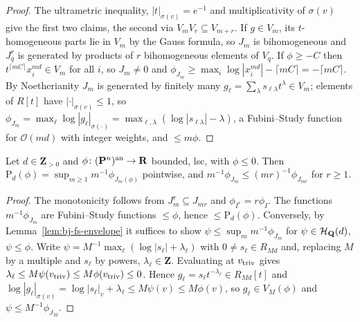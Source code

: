 \begin{proof}
The ultrametric inequality, $|t|_{\sigma(v)}=e^{-1}$ and multiplicativity of $\sigma(v)$ give the first
two claims, the second via $V_mV_r\subseteq V_{m+r}$. If $g\in V_m$, its $t$-homogeneous parts lie in $V_m$
by the Gauss formula, so $J_m$ is bihomogeneous and $J_q^r$ is generated by products of $r$ bihomogeneous
elements of $V_q$. If $\phi\ge-C$ then $t^{\lceil mC\rceil}x_i^{md}\in V_m$ for all $i$, so $J_m\ne0$ and
$\phi_{J_m}\ge\max_i\log|x_i^{md}|-\lceil mC\rceil=-\lceil mC\rceil$. By Noetherianity $J_m$ is
generated by finitely many $g_\ell=\sum_\lambda s_{\ell\lambda}t^\lambda\in V_m$; elements of $R[t]$ have
$|\cdot|_{\sigma(v)}\le1$, so $\phi_{J_m}=\max_\ell\log|g_\ell|_{\sigma(\cdot)}
=\max_{\ell,\lambda}(\log|s_{\ell\lambda}|-\lambda)$, a Fubini--Study function for $\mathcal O(md)$ with integer
weights, and $\le m\phi$.
\end{proof}

\begin{proposition}\label{prop:bj-envelope-Jm}
\leanok
{}
Let $d\in\mathbf{Z}_{>0}$ and $\phi\colon(\mathbf{P}^n)^{\mathrm{an}}\to\mathbf{R}$ bounded, lsc, with $\phi\le0$. Then
$\mathrm P_d(\phi)=\sup_{m\ge1}m^{-1}\phi_{J_m(\phi)}$ pointwise, and $m^{-1}\phi_{J_m}\le
(mr)^{-1}\phi_{J_{mr}}$ for $r\ge1$.
\end{proposition}

\begin{proof}
The monotonicity follows from $J_m^r\subseteq J_{mr}$ and $\phi_{I^r}=r\phi_I$. The functions
$m^{-1}\phi_{J_m}$ are Fubini--Study functions $\le\phi$, hence $\le\mathrm P_d(\phi)$. Conversely, by
Lemma~\ref{lem:bj-fs-envelope} it suffices to show $\psi\le\sup_mm^{-1}\phi_{J_m}$ for
$\psi\in\mathcal H_{\mathbf{Q}}(d)$, $\psi\le\phi$. Write $\psi=M^{-1}\max_\ell(\log|s_\ell|+\lambda_\ell)$ with
$0\ne s_\ell\in R_{Md}$ and, replacing $M$ by a multiple and $s_\ell$ by powers, $\lambda_\ell\in\mathbf{Z}$.
Evaluating at $v_{\mathrm{triv}}$ gives $\lambda_\ell\le M\psi(v_{\mathrm{triv}})\le M\phi(v_{\mathrm{triv}})\le0$. Hence
$g_\ell=s_\ell t^{-\lambda_\ell}\in R_{Md}[t]$ and $\log|g_\ell|_{\sigma(v)}=\log|s_\ell|_v+\lambda_\ell\le
M\psi(v)\le M\phi(v)$, so $g_\ell\in V_M(\phi)$ and $\psi\le M^{-1}\phi_{J_M}$.
\end{proof}

